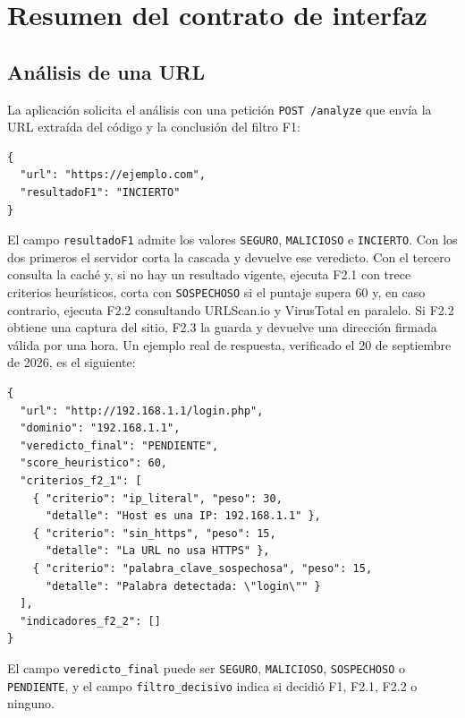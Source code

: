 
\chapter{Resumen del contrato de interfaz}
\label{anx:contrato}

\section{Análisis de una URL}

La aplicación solicita el análisis con una petición \texttt{POST /analyze} que envía la URL extraída del código y la conclusión del filtro F1:

\begin{verbatim}
{
  "url": "https://ejemplo.com",
  "resultadoF1": "INCIERTO"
}
\end{verbatim}

El campo \texttt{resultadoF1} admite los valores \texttt{SEGURO}, \texttt{MALICIOSO} e \texttt{INCIERTO}. Con los dos primeros el servidor corta la cascada y devuelve ese veredicto. Con el tercero consulta la caché y, si no hay un resultado vigente, ejecuta F2.1 con trece criterios heurísticos, corta con \texttt{SOSPECHOSO} si el puntaje supera 60 y, en caso contrario, ejecuta F2.2 consultando URLScan.io y VirusTotal en paralelo. Si F2.2 obtiene una captura del sitio, F2.3 la guarda y devuelve una dirección firmada válida por una hora. Un ejemplo real de respuesta, verificado el 20 de septiembre de 2026, es el siguiente:

\begin{verbatim}
{
  "url": "http://192.168.1.1/login.php",
  "dominio": "192.168.1.1",
  "veredicto_final": "PENDIENTE",
  "score_heuristico": 60,
  "criterios_f2_1": [
    { "criterio": "ip_literal", "peso": 30,
      "detalle": "Host es una IP: 192.168.1.1" },
    { "criterio": "sin_https", "peso": 15,
      "detalle": "La URL no usa HTTPS" },
    { "criterio": "palabra_clave_sospechosa", "peso": 15,
      "detalle": "Palabra detectada: \"login\"" }
  ],
  "indicadores_f2_2": []
}
\end{verbatim}

El campo \texttt{veredicto\_final} puede ser \texttt{SEGURO}, \texttt{MALICIOSO}, \texttt{SOSPECHOSO} o \texttt{PENDIENTE}, y el campo \texttt{filtro\_decisivo} indica si decidió F1, F2.1, F2.2 o ninguno.

